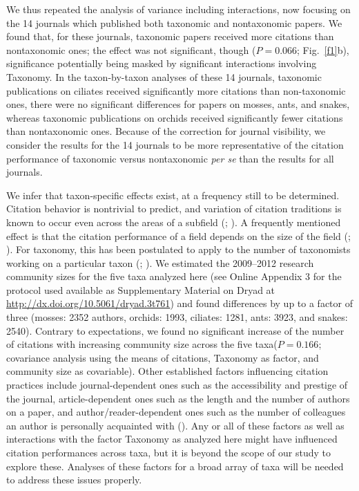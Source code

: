 \documentclass[webpdf,PV,mynatbib,surname,CE,MSC]{SYS-PV}
\begin{document}
We\enlargethispage{6pt} thus repeated the analysis of variance including interactions, now
focusing on the 14 journals which published both taxonomic and nontaxonomic papers. We found that,
for these journals, taxonomic papers received more citations than nontaxonomic ones; the effect
was not significant, though ($P=0.066$; Fig.~\ref{f1}b), significance potentially being masked by
significant interactions involving Taxonomy. In the taxon-by-taxon analyses of these 14 journals,
taxonomic publications on ciliates received significantly more citations than non-taxonomic ones,
there were no significant differences for papers on mosses, ants, and snakes, whereas taxonomic
publications on orchids received significantly fewer citations than nontaxonomic ones. Because of
the correction for journal visibility, we consider the results for the 14 journals to be more
representative of the citation performance of taxonomic versus nontaxonomic \textit{per se} than
the results for all journals.

We infer that taxon-specific effects exist, at a frequency still to be determined. Citation
behavior is nontrivial to predict, and variation of citation traditions is known to occur even
across the areas of a subfield (\citealt{11Bornmann2008}; \citealt{22Erikson2014}). A frequently
mentioned effect is that the citation performance of a field depends on the size of the field
(\citealt{11Bornmann2008}; \citealt{16Casadevall2014}). For taxonomy, this has been postulated to
apply to the number of taxonomists working on a particular taxon (\citealt{32Krell2002};
\citealt{34McDade2011}). We estimated the 2009--2012 research community sizes for the five taxa
analyzed here (see Online Appendix 3 for the protocol used available as Supplementary Material on
Dryad at \href{http://dx.doi.org/10.5061/dryad.3t761}{http://dx.doi.org/10.5061/dryad.3t761}) and
found differences by up to a factor of three (mosses: 2352 authors, orchids: 1993, ciliates: 1281,
ants: 3923, and snakes: 2540). Contrary to expectations, we found no significant increase of the
number of citations with increasing community size across the five taxa\break ($P=0.166$;
covariance analysis using the means of citations, Taxonomy as factor, and community size as
covariable). Other established factors influencing citation practices include journal-dependent
ones such as the accessibility and prestige of the journal, article-dependent ones such as the
length and the number of authors on a paper, and author/reader-dependent ones such as the number
of colleagues an author is personally acquainted with (\citealt{11Bornmann2008}). Any or all of
these factors as well as interactions with the factor Taxonomy as analyzed here might have
influenced citation performances across taxa, but it is beyond the scope of our study to explore
these. Analyses of these factors for a broad array of taxa will be needed to address these issues
properly.
\end{document}
